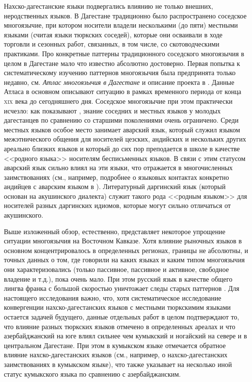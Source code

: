 \par Нахско-дагестанские языки подвергались влиянию не только внешних, неродственных языков. В Дагестане традиционно было распространено соседское многоязычие, при котором носители владели несколькими (до пяти) местными языками (считая языки тюркских соседей), которые они осваивали в ходе торговли и сезонных работ, связанных, в том числе, со скотоводческими практиками. Про конкретные паттерны традиционного соседского многоязычия в целом в Дагестане мало что известно абсолютно достоверно. Первая попытка к систематическому изучению паттернов многоязычия была предпринята только недавно, см. \textit{Атлас многоязычия в Дагестане} \citep{multidag} и описание проекта в \citep{dobrushina2011}. Данные Атласа в основном описывают ситуацию в рамках временного периода от конца \textsc{xix} века до сегодняшнего дня. Соседское многоязычие при этом практически исчезло: как показывают \citep{dobrushina2019}, знание соседних и местных языков у молодых дагестанцев по сравнению со старшими поколениями очень ограничено. Среди местных языков особое место занимает аварский язык, который служил языком межэтнического общения для носителей цезских, андийских и нескольких других ареально близких языков и который до сих пор преподается в школе в качестве <<родного языка>> носителям бесписьменных языков. В связи с этим статусом аварский язык сильно влиял на эти языки, что отражается в многочисленных заимствованиях (см., например, подробнее о языковых контактах конкретно андийцев с аварским языком в \citep{khalidova2006}). Литературный даргинский язык (который основан на акушинского диалекта) служит такого рода <<родным языком>> для носителей разных даргинских идиомов, которые могут сильно отличаться от акушинского.
\par Выше изложенный обзор, естественно, представляет некоторое упрощение ситуации многоязычия на Восточном Кавказе. Хотя влияние рыночных языков в основном концентрировалось в определенных регионах, границы не абсолютны, и точных данных о том, где говорили на каких языках и каким типом многоязычия они характеризовались (только пассивное, пассивное и активное, свободное владение и т.д.), пока очень мало. При этом русский язык в качестве общего лингва франка с большой скоростью уничтожает следы старых паттернов \citep{dobrushina2019}. Для настоящего исследования важно, что, хотя систематическое исследование конвергенции нахско-дагестанских языков с местными тюркскимим языками остается задачей будущего, данные отдельных работ в целом подтверждают то, что влияние разных тюркских языков отмечено в определенных ареалах и что азербайджанский на юге влиял сильнее чем кумыкский и ногайский на севере и в центральном Дагестане. При этом в кумыкском языке отмечается обратное влияние нахско-дагестанских языков (см., например, \citep{selimova2016} о нахско-дагестанских заимствованиях в кумыкском языке), что также указывает на несколько иной статус кумыкского языка по сравнению с азербайджанским. 
